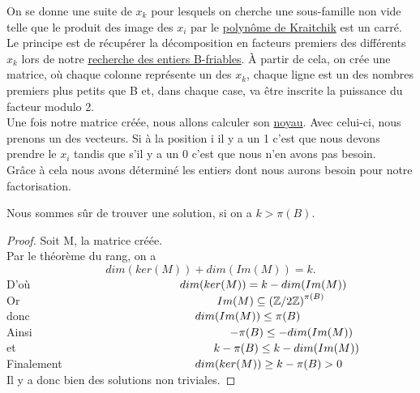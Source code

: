 On se donne une suite de $x_k$ pour lesquels on cherche une sous-famille non vide telle que le produit des image des $x_i$ par le \hyperref[polynome de Kraitchik]{polynôme de Kraitchik} est un carré.\\

Le principe est de récupérer la décomposition en facteurs premiers des différents $x_k$ lors de notre \hyperref[B-friabilite]{recherche des entiers B-friables}. 
À partir de cela, on crée une matrice, où chaque colonne représente un  des $x_k$, chaque ligne est un des nombres premiers plus petits que B et, dans chaque case, va être inscrite la puissance du facteur modulo 2.\\

Une fois notre matrice créée, nous allons calculer son \hyperref[Noyau]{noyau}. 
Avec celui-ci, nous prenons un des vecteurs. Si à la position i il y a un 1 c'est que nous devons prendre le $x_i$ tandis que s'il y a un 0 c'est que nous n'en avons pas besoin.\\

Grâce à cela nous avons déterminé les entiers dont nous aurons besoin pour notre factorisation.\\

\begin{proposition}
    Nous sommes sûr de trouver une solution, si on a $k > \pi(B)$.
\end{proposition}

\begin{proof}
    Soit M, la matrice créée.\\
    Par le théorème du rang, on a \[dim(ker(M)) + dim(Im(M)) = k.\]
    D'où $\hspace{4.5cm}dim(ker(M)) = k - dim(Im(M))\vspace{2mm}$\\
    Or $\hspace{6cm}Im(M) \subseteq {(\mathbb{Z}/2\mathbb{Z})}^{\pi(B)}\vspace{2mm}$\\
    donc $\hspace{5cm}dim(Im(M)) \le \pi(B)\vspace{2mm}$\\
    Ainsi $\hspace{6cm}-\pi(B) \le - dim(Im(M))\vspace{2mm}$\\
    et $\hspace{6cm}k - \pi(B) \le k - dim(Im(M))\vspace{2mm}$\\
    Finalement $\hspace{4cm}dim(ker(M)) \geq k - \pi(B) > 0\vspace{2mm}$\\
    Il y a donc bien des solutions non triviales.
\end{proof}

